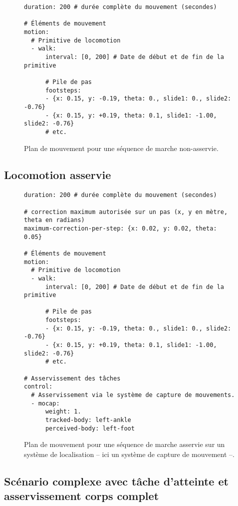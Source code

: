 \begin{figure}
  \begin{center}
\begin{verbatim}
duration: 200 # durée complète du mouvement (secondes)

# Éléments de mouvement
motion:
  # Primitive de locomotion
  - walk:
      interval: [0, 200] # Date de début et de fin de la primitive

      # Pile de pas
      footsteps:
      - {x: 0.15, y: -0.19, theta: 0., slide1: 0., slide2: -0.76}
      - {x: 0.15, y: +0.19, theta: 0.1, slide1: -1.00, slide2: -0.76}
      # etc.
\end{verbatim}
  \end{center}
  \caption{Plan de mouvement pour une séquence de marche non-asservie.}
\end{figure}

\subsection{Locomotion asservie}

\begin{figure}
  \begin{center}
\begin{verbatim}
duration: 200 # durée complète du mouvement (secondes)

# correction maximum autorisée sur un pas (x, y en mètre, theta en radians)
maximum-correction-per-step: {x: 0.02, y: 0.02, theta: 0.05}

# Éléments de mouvement
motion:
  # Primitive de locomotion
  - walk:
      interval: [0, 200] # Date de début et de fin de la primitive

      # Pile de pas
      footsteps:
      - {x: 0.15, y: -0.19, theta: 0., slide1: 0., slide2: -0.76}
      - {x: 0.15, y: +0.19, theta: 0.1, slide1: -1.00, slide2: -0.76}
      # etc.

# Asservissement des tâches
control:
  # Asservissement via le système de capture de mouvements.
  - mocap:
      weight: 1.
      tracked-body: left-ankle
      perceived-body: left-foot
\end{verbatim}
  \end{center}
  \caption{Plan de mouvement pour une séquence de marche asservie sur
    un système de localisation -- ici un système de capture de
    mouvement --.}
\end{figure}


\subsection{Scénario complexe avec tâche d'atteinte et asservissement corps complet}

